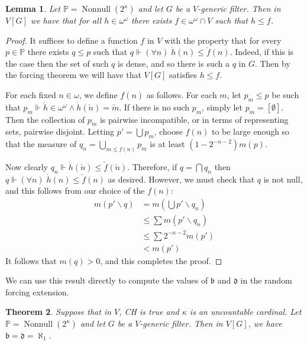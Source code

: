 \documentclass[11pt,oneside]{amsbook}
\newcommand{\PP}{\mathbb P}
\newcommand{\forces}{\Vdash}
\DeclareMathOperator{\Nonnull}{Nonnull}
\theoremstyle{definition}
\theoremstyle{plain}
\newtheorem{thm}{Theorem}[section]
\newtheorem{lem}[thm]{Lemma}
\theoremstyle{definition}
\theoremstyle{remark}
\numberwithin{equation}{section}
\numberwithin{figure}{section}
\begin{document}
\begin{lem}
  Let $\PP=\Nonnull(2^\kappa)$ and let $G$ be a $V$-generic filter. Then in $V[G]$ we have that for all $h\in\omega^\omega$ there exists $f\in \omega^\omega\cap V$ such that $h\leq f$.
\end{lem}

\begin{proof}
  It suffices to define a function $f$ in $V$ with the property that for every $p\in\PP$ there exists $q\leq p$ such that $q\forces(\forall n)\;\dot h(n)\leq\check f(n)$. Indeed, if this is the case then the set of such $q$ is dense, and so there is such a $q$ in $G$. Then by the forcing theorem we will have that $V[G]$ satisfies $h\leq f$.
  
  For each fixed $n\in\omega$, we define $f(n)$ as follows. For each $m$, let $p_m\leq p$ be such that $p_m\forces\dot h\in\omega^\omega\wedge\dot h(\check n)=\check m$. If there is no such $p_m$, simply let $p_m=[\emptyset]$. Then the collection of $p_m$ is pairwise incompatible, or in terms of representing sets, pairwise disjoint. Letting $p'=\bigcup p_m$, choose $f(n)$ to be large enough so that the measure of $q_n=\bigcup_{m\leq f(n)}p_m$ is at least $(1-2^{-n-2})m(p)$.

  Now clearly $q_n\forces\dot h(\check n)\leq\check f(\check n)$. Therefore, if $q=\bigcap q_n$ then $q\forces(\forall n)\;\dot h(n)\leq\check f(n)$ as desired. However, we must check that $q$ is not null, and this follows from our choice of the $f(n)$:
  \begin{align*}
    m(p'\smallsetminus q)&=m(\bigcup p'\smallsetminus q_n)\\
                        &\leq\sum m(p'\smallsetminus q_n)\\
                        &\leq\sum 2^{-n-2}m(p')\\
                        &<m(p')
  \end{align*}
  It follows that $m(q)>0$, and this completes the proof.
\end{proof}

We can use this result directly to compute the values of $\mathfrak b$ and $\mathfrak d$ in the random forcing extension.

\begin{thm}
  \label{thm:random-bd}
  Suppose that in $V$, CH is true and $\kappa$ is an uncountable cardinal. Let $\PP=\Nonnull(2^\kappa)$ and let $G$ be a $V$-generic filter. Then in $V[G]$, we have $\mathfrak b=\mathfrak d=\aleph_1$.
\end{thm}
\end{document}
